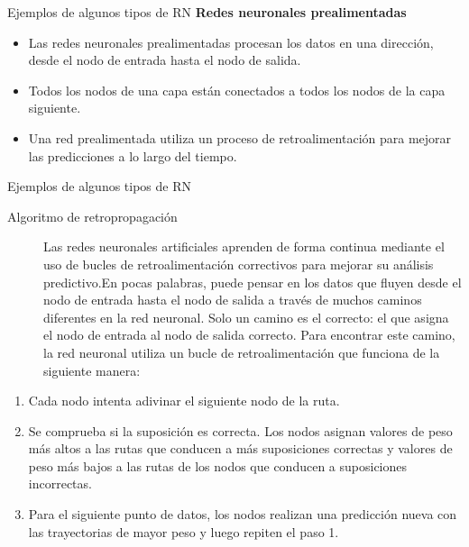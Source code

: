 \documentclass[11pt,aspectratio=169]{beamer}
\begin{document}
\begin{frame}{Ejemplos de algunos tipos de RN}
	\textbf{Redes neuronales prealimentadas}
	\begin{itemize}
		\item Las redes neuronales prealimentadas procesan los datos en una dirección, desde el nodo de entrada hasta el nodo de salida. \pause
		\item Todos los nodos de una capa están conectados a todos los nodos de la capa siguiente.\pause
		\item Una red prealimentada utiliza un proceso de retroalimentación para mejorar las predicciones a lo largo del tiempo.
	\end{itemize}
\end{frame}

\begin{frame}{Ejemplos de algunos tipos de RN}
	\begin{description}
		\item[Algoritmo de retropropagación] Las redes neuronales artificiales aprenden de forma continua mediante el uso de bucles de 
			retroalimentación correctivos para mejorar su análisis predictivo.\pause En pocas palabras, puede pensar en los datos que 
			fluyen desde el nodo de entrada hasta el nodo de salida a través de muchos caminos diferentes en la red neuronal. \pause 
			Solo un camino es el correcto: el que asigna el nodo de entrada al nodo de salida correcto.\pause  
			Para encontrar este camino, la red neuronal utiliza un bucle de retroalimentación que funciona de la siguiente manera:\pause
	\end{description}
	\begin{enumerate}
		\item Cada nodo intenta adivinar el siguiente nodo de la ruta. \pause
		\item Se comprueba si la suposición es correcta. Los nodos asignan valores de peso más altos a las rutas que conducen a más 
			suposiciones correctas y valores de peso más bajos a las rutas de los nodos que conducen a suposiciones incorrectas.\pause
		\item Para el siguiente punto de datos, los nodos realizan una predicción nueva con las trayectorias de mayor peso y 
			luego repiten el paso 1.	
	\end{enumerate}
\end{frame}
\end{document}
